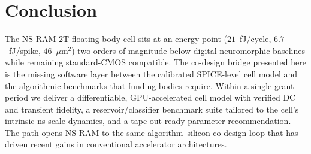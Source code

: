 \documentclass[fontsize=10pt]{article}
\begin{document}
\section{Conclusion}
The NS-RAM 2T floating-body cell sits at an energy point ($21$~fJ/cycle,
$6.7$~fJ/spike, $46$~$\mu$m$^2$) two orders of magnitude below digital
neuromorphic baselines while remaining standard-CMOS compatible. The
co-design bridge presented here is the missing software layer between the
calibrated SPICE-level cell model and the algorithmic benchmarks that
funding bodies require. Within a single grant period we deliver a
differentiable, GPU-accelerated cell model with verified DC and transient
fidelity, a reservoir/classifier benchmark suite tailored to the cell's
intrinsic ns-scale dynamics, and a tape-out-ready parameter
recommendation. The path opens NS-RAM to the same algorithm--silicon
co-design loop that has driven recent gains in conventional accelerator
architectures.


\begin{thebibliography}{}
\end{thebibliography}


 
\end{document}
